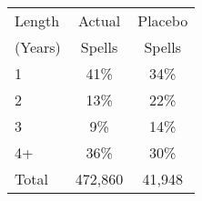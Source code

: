 \begin{tabular}{lcc}
\toprule
Length & Actual & Placebo \\
(Years) & Spells & Spells \\
\midrule
1 & 41\% & 34\% \\
2 & 13\% & 22\% \\
3 & 9\% & 14\% \\
4+ & 36\% & 30\% \\
Total &      472,860 &       41,948 \\
\bottomrule
\end{tabular}
